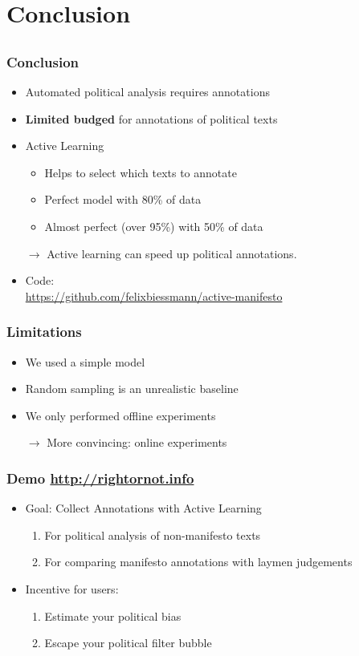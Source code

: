 \documentclass[]{beamer}
\begin{document}
\section{Conclusion}
\subsection{}


\begin{frame}\frametitle{Conclusion}
\begin{itemize}
\item Automated political analysis requires annotations
\item \textbf{Limited budged} for annotations of political texts 
\item Active Learning
\begin{itemize}
\item Helps to select which texts to annotate
\item Perfect model with 80\% of data
\item Almost perfect (over 95\%) with 50\% of data
\end{itemize}
\item[$\rightarrow$] Active learning can speed up political annotations. 
\item Code:\\
\footnotesize
 \url{https://github.com/felixbiessmann/active-manifesto} 
\end{itemize}
\end{frame}

\begin{frame}\frametitle{Limitations}
\begin{itemize}
\item We used a simple model
\item Random sampling is an unrealistic baseline
\item We only performed offline experiments
\item[$\rightarrow$] More convincing: online experiments
\end{itemize}
\end{frame}

\begin{frame}\frametitle{Demo \url{http://rightornot.info}}
\begin{itemize}
\item Goal: Collect Annotations with Active Learning
\begin{enumerate}
\item For political analysis of non-manifesto texts
\item For comparing manifesto annotations with laymen judgements
\end{enumerate}
\item Incentive for users: 
\begin{enumerate}
\item Estimate your political bias
\item Escape your political filter bubble
\end{enumerate}
\end{itemize}
\centering
\end{frame}
\end{document}
